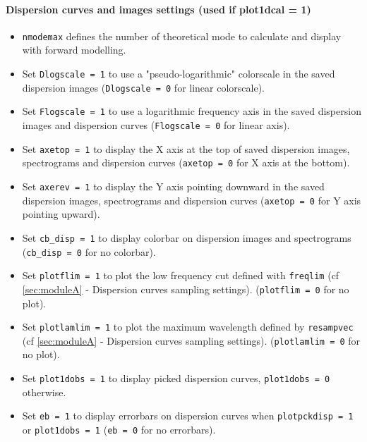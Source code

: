\documentclass[twoside,a4paper]{article}
\begin{document}
\paragraph{Dispersion curves and images settings (used if plot1dcal = 1)}
\begin{itemize}[leftmargin=*]
\setlength\itemsep{2ex}
\item \verb|nmodemax| defines the number of theoretical mode to calculate and display with forward modelling.

\item Set \verb|Dlogscale = 1| to use a "pseudo-logarithmic" colorscale in the saved dispersion images (\verb|Dlogscale = 0| for linear colorscale).

\item Set \verb|Flogscale = 1| to use a logarithmic frequency axis in the saved dispersion images and dispersion curves (\verb|Flogscale = 0| for linear axis).

\item Set \verb|axetop = 1| to display the X axis at the top of saved dispersion images, spectrograms and dispersion curves (\verb|axetop = 0| for X axis at the bottom).

\item Set \verb|axerev = 1| to display the Y axis pointing downward in the saved dispersion images, spectrograms and dispersion curves (\verb|axetop = 0| for Y axis pointing upward).

\item Set \verb|cb_disp = 1| to display colorbar on dispersion images and spectrograms (\verb|cb_disp = 0| for no colorbar).

\item Set \verb|plotflim = 1| to plot the low frequency cut defined with \verb|freqlim| (cf \ref{sec:moduleA} - Dispersion curves sampling settings). (\verb|plotflim = 0| for no plot).

\item Set \verb|plotlamlim = 1| to plot the maximum wavelength defined by \verb|resampvec| (cf \ref{sec:moduleA} - Dispersion curves sampling settings). (\verb|plotlamlim = 0| for no plot).

\item Set \verb|plot1dobs = 1| to display picked dispersion curves, \verb|plot1dobs = 0| otherwise.

\item Set \verb|eb = 1| to display errorbars on dispersion curves when \verb|plotpckdisp = 1| or \verb|plot1dobs = 1| (\verb|eb = 0| for no errorbars).


\end{itemize}
\end{document}
